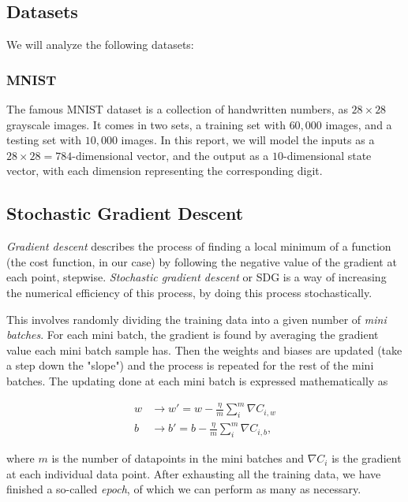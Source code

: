 \documentclass[../main.tex]{subfiles}
\begin{document}
\subsection{Datasets}
We will analyze the following datasets:
\subsubsection{MNIST}
The famous MNIST dataset is a collection of handwritten numbers, as $28\times 28$ grayscale images. It comes in two sets, a training set with $60,000$ images, and a testing set with $10,000$ images. In this report, we will model the inputs as a $28\times 28 = 784$-dimensional vector, and the output as a $10$-dimensional state vector, with each dimension representing the corresponding digit.

\subsection{Stochastic Gradient Descent}\label{sec:sgd}
\textit{Gradient descent} describes the process of finding a local minimum of a function (the cost function, in our case) by following the negative value of the gradient at each point, stepwise. \textit{Stochastic gradient descent} or SDG is a way of increasing the numerical efficiency of this process, by doing this process stochastically.

This involves randomly dividing the training data into a given number of \textit{mini batches}. For each mini batch, the gradient is found by averaging the gradient value each mini batch sample has. Then the weights and biases are updated (take a step down the "slope") and the process is repeated for the rest of the mini batches. The updating done at each mini batch is expressed mathematically as

\begin{align*}
    w&\rightarrow w' = w - \frac{\eta}{m}\sum_i^m \nabla C_{i,w} \\
    b&\rightarrow b' = b - \frac{\eta}{m}\sum_i^m \nabla C_{i,b},
\end{align*}

where $m$ is the number of datapoints in the mini batches and $\nabla C_i$ is the gradient at each individual data point. After exhausting all the training data, we have finished a so-called \textit{epoch}, of which we can perform as many as necessary.
\end{document}
